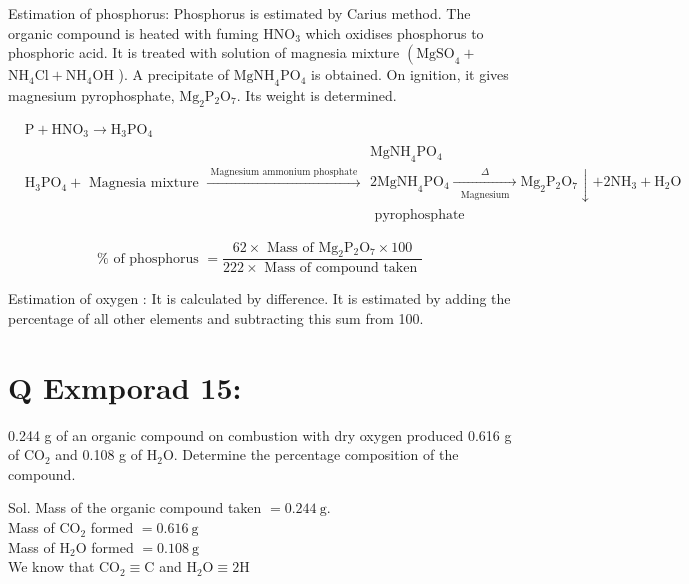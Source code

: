 \documentclass[10pt]{article}
\begin{document}
Estimation of phosphorus: Phosphorus is estimated by Carius method. The organic compound is heated with fuming $\mathrm{HNO}_{3}$ which oxidises phosphorus to phosphoric acid. It is treated with solution of magnesia mixture $\left(\mathrm{MgSO}_{4}+\right.$ $\mathrm{NH}_{4} \mathrm{Cl}+\mathrm{NH}_{4} \mathrm{OH}$ ). A precipitate of $\mathrm{MgNH}_{4} \mathrm{PO}_{4}$ is obtained. On ignition, it gives magnesium pyrophosphate, $\mathrm{Mg}_{2} \mathrm{P}_{2} \mathrm{O}_{7}$. Its weight is determined.

$$
\begin{aligned}
& \mathrm{P}+\mathrm{HNO}_{3} \longrightarrow \mathrm{H}_{3} \mathrm{PO}_{4} \\
& \mathrm{H}_{3} \mathrm{PO}_{4}+\text { Magnesia mixture } \xrightarrow{\text { Magnesium ammonium phosphate }} \begin{array}{c}
\mathrm{MgNH}_{4} \mathrm{PO}_{4} \\
2 \mathrm{MgNH}_{4} \mathrm{PO}_{4} \xrightarrow[\begin{array}{c}
\text { Magnesium }
\end{array}]{\Delta} \mathrm{Mg}_{2} \mathrm{P}_{2} \mathrm{O}_{7} \downarrow+2 \mathrm{NH}_{3}+\mathrm{H}_{2} \mathrm{O} \\
\text { pyrophosphate }
\end{array}
\end{aligned}
$$

$$
\% \text { of phosphorus }=\frac{62 \times \text { Mass of } \mathrm{Mg}_{2} \mathrm{P}_{2} \mathrm{O}_{7} \times 100}{222 \times \text { Mass of compound taken }}
$$

Estimation of oxygen : It is calculated by difference. It is estimated by adding the percentage of all other elements and subtracting this sum from 100.

\section*{Q Exmporad 15:}
0.244 g of an organic compound on combustion with dry oxygen produced 0.616 g of $\mathrm{CO}_{2}$ and 0.108 g of $\mathrm{H}_{2} \mathrm{O}$. Determine the percentage composition of the compound.

Sol. Mass of the organic compound taken $=0.244 \mathrm{~g}$.\\
Mass of $\mathrm{CO}_{2}$ formed $=0.616 \mathrm{~g}$\\
Mass of $\mathrm{H}_{2} \mathrm{O}$ formed $=0.108 \mathrm{~g}$\\
We know that $\mathrm{CO}_{2} \equiv \mathrm{C}$ and $\mathrm{H}_{2} \mathrm{O} \equiv 2 \mathrm{H}$
\end{document}
